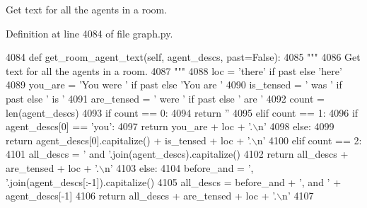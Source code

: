 \begin{DoxyVerb}Get text for all the agents in a room.
\end{DoxyVerb}
 

Definition at line 4084 of file graph.\+py.


\begin{DoxyCode}
4084     \textcolor{keyword}{def }get\_room\_agent\_text(self, agent\_descs, past=False):
4085         \textcolor{stringliteral}{"""}
4086 \textcolor{stringliteral}{        Get text for all the agents in a room.}
4087 \textcolor{stringliteral}{        """}
4088         loc = \textcolor{stringliteral}{'there'} \textcolor{keywordflow}{if} past \textcolor{keywordflow}{else} \textcolor{stringliteral}{'here'}
4089         you\_are = \textcolor{stringliteral}{'You were '} \textcolor{keywordflow}{if} past \textcolor{keywordflow}{else} \textcolor{stringliteral}{'You are '}
4090         is\_tensed = \textcolor{stringliteral}{' was '} \textcolor{keywordflow}{if} past \textcolor{keywordflow}{else} \textcolor{stringliteral}{' is '}
4091         are\_tensed = \textcolor{stringliteral}{' were '} \textcolor{keywordflow}{if} past \textcolor{keywordflow}{else} \textcolor{stringliteral}{' are '}
4092         count = len(agent\_descs)
4093         \textcolor{keywordflow}{if} count == 0:
4094             \textcolor{keywordflow}{return} \textcolor{stringliteral}{''}
4095         \textcolor{keywordflow}{elif} count == 1:
4096             \textcolor{keywordflow}{if} agent\_descs[0] == \textcolor{stringliteral}{'you'}:
4097                 \textcolor{keywordflow}{return} you\_are + loc + \textcolor{stringliteral}{'.\(\backslash\)n'}
4098             \textcolor{keywordflow}{else}:
4099                 \textcolor{keywordflow}{return} agent\_descs[0].capitalize() + is\_tensed + loc + \textcolor{stringliteral}{'.\(\backslash\)n'}
4100         \textcolor{keywordflow}{elif} count == 2:
4101             all\_descs = \textcolor{stringliteral}{' and '}.join(agent\_descs).capitalize()
4102             \textcolor{keywordflow}{return} all\_descs + are\_tensed + loc + \textcolor{stringliteral}{'.\(\backslash\)n'}
4103         \textcolor{keywordflow}{else}:
4104             before\_and = \textcolor{stringliteral}{', '}.join(agent\_descs[:-1]).capitalize()
4105             all\_descs = before\_and + \textcolor{stringliteral}{', and '} + agent\_descs[-1]
4106             \textcolor{keywordflow}{return} all\_descs + are\_tensed + loc + \textcolor{stringliteral}{'.\(\backslash\)n'}
4107 
\end{DoxyCode}
\mbox{\label{classlight__chats_1_1graph_1_1Graph_a6e638e9bda7cd6e0f6d964d02a22dec6}} 

